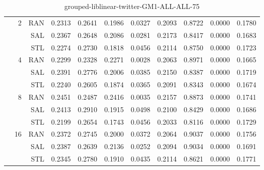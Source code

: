 \begin{center}
\begin{table}[htbp]
\begin{tabular}{ | r | r | r | r | r | r | r | r | r | r | r |}
 & \multirow{3}{*}{2} & RAN & 0.2313 & 0.2641 & 0.1986 & 0.0327 & 0.2093 & 0.8722 & 0.0000 & 0.1780\\ \cline{3-11}
 &   & SAL & 0.2367 & 0.2648 & 0.2086 & 0.0281 & 0.2173 & 0.8417 & 0.0000 & 0.1683\\ \cline{3-11}
 &   & STL & 0.2274 & 0.2730 & 0.1818 & 0.0456 & 0.2114 & 0.8750 & 0.0000 & 0.1723\\ \cline{2-11}
 & \multirow{3}{*}{4} & RAN & 0.2299 & 0.2328 & 0.2271 & 0.0028 & 0.2063 & 0.8971 & 0.0000 & 0.1665\\ \cline{3-11}
 &   & SAL & 0.2391 & 0.2776 & 0.2006 & 0.0385 & 0.2150 & 0.8387 & 0.0000 & 0.1719\\ \cline{3-11}
 &   & STL & 0.2240 & 0.2605 & 0.1874 & 0.0365 & 0.2091 & 0.8343 & 0.0000 & 0.1674\\ \cline{2-11}
 & \multirow{3}{*}{8} & RAN & 0.2451 & 0.2487 & 0.2416 & 0.0035 & 0.2157 & 0.8873 & 0.0000 & 0.1741\\ \cline{3-11}
 &   & SAL & 0.2413 & 0.2910 & 0.1915 & 0.0498 & 0.2100 & 0.8429 & 0.0000 & 0.1686\\ \cline{3-11}
 &   & STL & 0.2199 & 0.2654 & 0.1743 & 0.0456 & 0.2033 & 0.8116 & 0.0000 & 0.1729\\ \cline{2-11}
 & \multirow{3}{*}{16} & RAN & 0.2372 & 0.2745 & 0.2000 & 0.0372 & 0.2064 & 0.9037 & 0.0000 & 0.1756\\ \cline{3-11}
 &   & SAL & 0.2387 & 0.2639 & 0.2136 & 0.0252 & 0.2094 & 0.9034 & 0.0000 & 0.1691\\ \cline{3-11}
 &   & STL & 0.2345 & 0.2780 & 0.1910 & 0.0435 & 0.2114 & 0.8621 & 0.0000 & 0.1771\\ \cline{2-11}
\hline
\end{tabular}
\caption{grouped-liblinear-twitter-GM1-ALL-ALL-75}
\end{table}
\end{center}


